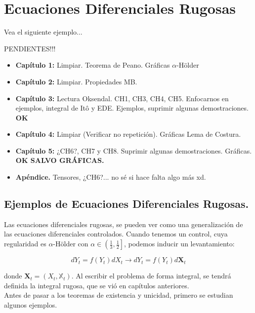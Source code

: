 \chapter{Ecuaciones Diferenciales Rugosas}

Vea el siguiente ejemplo...

PENDIENTES!!!

\begin{itemize}
	\item  \textbf{Capítulo 1:} Limpiar. Teorema de Peano. Gráficas $\alpha$-Hölder
	\item \textbf{Capítulo 2:} Limpiar. Propiedades MB.
	\item \textbf{Capítulo 3:} Lectura Oksendal. CH1, CH3, CH4, CH5. Enfocarnos en ejemplos, integral de Itô y EDE. Ejemplos, suprimir algunas demostraciones. \textbf{OK}
	\item \textbf{Capítulo 4:} Limpiar (Verificar no repetición). Gráficas Lema de Costura.
	\item \textbf{Capítulo 5:} ¿CH6?, CH7 y CH8. Suprimir algunas demostraciones. Gráficas.   \textbf{OK SALVO GRÁFICAS.}
	\item \textbf{Apéndice.} Tensores, ¿CH6?... no sé si hace falta algo más xd.
\end{itemize}



\section{Ejemplos de Ecuaciones Diferenciales Rugosas.}

Las ecuaciones diferenciales rugosas, se pueden ver como una generalización de las ecuaciones diferenciales controlados. Cuando tenemos un control, cuya regularidad es $\alpha$-Hölder con $\alpha \in \left( \frac{1}{3}, \frac{1}{2} \right]$, podemos inducir un levantamiento:

\[
	dY_t = f(Y_t) dX_t \rightarrow  dY_t = f(Y_t) d\mathbf{X}_t
\]

donde $\mathbf{X}_t = (X_t, \mathbb{X}_t)$. Al escribir el problema de forma integral, se tendrá definida la integral rugosa, que se vió en capítulos anteriores. \\

Antes de pasar a los teoremas de existencia y unicidad, primero se estudian algunos ejemplos.

